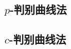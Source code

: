 
\begin{issues}
\issueDraft
\end{issues}

\subsection{$p$-判别曲线法}\label{sub_ODEa6_1}

\subsection{$c$-判别曲线法}\label{sub_ODEa6_2}